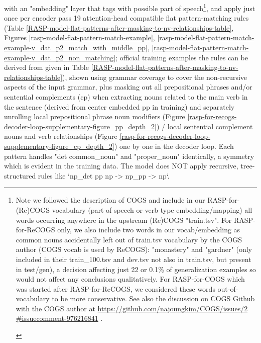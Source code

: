 \documentclass[11pt]{article}
\begin{document}
with an "embedding" layer that tags with possible part of speech\footnote{\begin{footnotesize}Note we followed the \citep{klinger2024compositionalprogramgenerationfewshot} description of COGS and include in our RASP-for-(Re)COGS vocabulary (part-of-speech or verb-type embedding/mapping) all words occurring anywhere in the upstream (Re)COGS "train.tsv". For RASP-for-ReCOGS only, we also include two words in our vocab/embedding as common nouns accidentally left out of train.tsv vocabulary by the COGS author (COGS vocab is used by ReCOGS): "monastery" and "gardner" (only included in their train\_100.tsv and dev.tsv not also in train.tsv, but present in test/gen), a decision affecting just 22 or 0.1\% of generalization examples so would not affect any conclusions qualitatively. For RASP-for-COGS which was started after RASP-for-ReCOGS, we considered these words out-of-vocabulary to be more conservative. See also the discussion on COGS Github with the COGS author at \href{https://github.com/najoungkim/COGS/issues/2\#issuecomment-976216841}{https://github.com/najoungkim/COGS/issues/2
\#issuecomment-976216841} .\end{footnotesize}}, and apply just once per encoder pass 19 attention-head compatible flat pattern-matching rules (Table \ref{RASP-model-flat-patterns-after-masking-to-nv-relationships-table}, Figures \ref{rasp-model-flat-pattern-match-example}, \ref{rasp-model-flat-pattern-match-example-v_dat_p2_match_with_middle_pp}, \ref{rasp-model-flat-pattern-match-example-v_dat_p2_non_matching}; official training examples the rules can be derived from given in Table \ref{RASP-model-flat-patterns-after-masking-to-nv-relationships-table}), shown using grammar coverage \citep{fuzzingbook2023:GrammarCoverageFuzzer} to cover the non-recursive aspects of the input grammar, plus masking out all prepositional phrases and/or sentential complements (cp) when extracting nouns related to the main verb in the sentence (derived from center embedded pp in training) and separately unrolling local prepositional phrase noun modifiers (Figure \ref{rasp-for-recogs-decoder-loop-supplementary-figure_pp_depth_2}) / local sentential complement nouns and verb relationships (Figure \ref{rasp-for-recogs-decoder-loop-supplementary-figure_cp_depth_2}) one by one in the decoder loop. Each pattern handles "det common\_noun" and "proper\_noun" identically, a symmetry which is evident in the training data. The model does NOT apply recursive, tree-structured rules like `np\_det pp np -> np\_pp -> np`.
\end{document}
